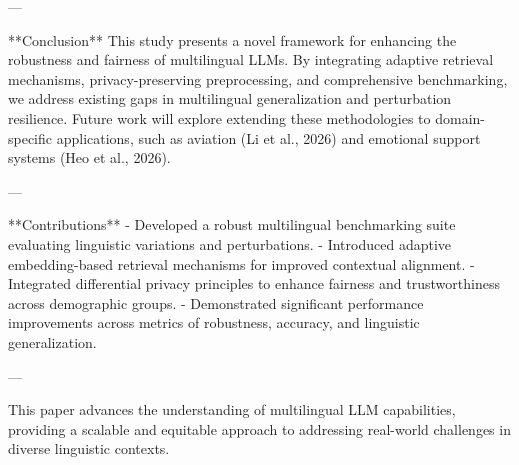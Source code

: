 ---

**Conclusion**  
This study presents a novel framework for enhancing the robustness and fairness of multilingual LLMs. By integrating adaptive retrieval mechanisms, privacy-preserving preprocessing, and comprehensive benchmarking, we address existing gaps in multilingual generalization and perturbation resilience. Future work will explore extending these methodologies to domain-specific applications, such as aviation (Li et al., 2026) and emotional support systems (Heo et al., 2026).  

---

**Contributions**  
- Developed a robust multilingual benchmarking suite evaluating linguistic variations and perturbations.  
- Introduced adaptive embedding-based retrieval mechanisms for improved contextual alignment.  
- Integrated differential privacy principles to enhance fairness and trustworthiness across demographic groups.  
- Demonstrated significant performance improvements across metrics of robustness, accuracy, and linguistic generalization.  

--- 

This paper advances the understanding of multilingual LLM capabilities, providing a scalable and equitable approach to addressing real-world challenges in diverse linguistic contexts.  